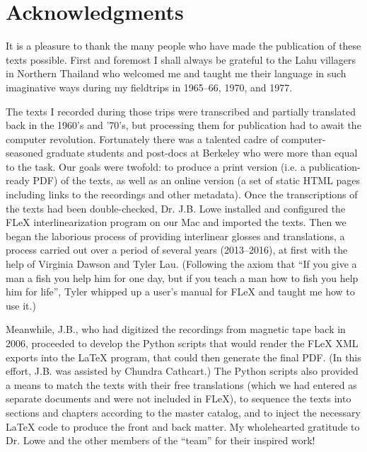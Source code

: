 \thispagestyle{empty}
\renewcommand{\thefootnote}{\arabic{footnote}}
\setcounter{footnote}{0}

\section*{Acknowledgments}
It is a pleasure to thank the many people who have made the publication
of these texts possible. First and foremost I shall always be grateful
to the Lahu villagers in Northern Thailand who welcomed me and taught me
their language in such imaginative ways during my fieldtrips in 1965--66,
1970, and 1977.

The texts I recorded during those trips were transcribed and partially
translated back in the 1960's and '70's, but processing them for
publication had to await the computer revolution. Fortunately there
was a talented cadre of computer-seasoned graduate students and
post-docs at Berkeley who were more than equal to the task. Our goals
were twofold: to produce a print version (i.e. a publication-ready PDF) of
the texts, as well as an online version (a set of static HTML pages
including links to the recordings and other metadata). Once the
transcriptions of the texts had been double-checked, Dr. J.B. Lowe
installed and configured the FLeX interlinearization program on our Mac
and imported the texts. Then we began the laborious process of providing
interlinear glosses and translations, a process
carried out over a period of several years (2013--2016), at first with
the help of Virginia Dawson and Tyler Lau.  (Following the axiom that
``If you give a man a fish you help him for one day, but if you teach
a man how to fish you help him for life'', Tyler whipped up a user's
manual for FLeX and taught me how to use it.)

Meanwhile, J.B., who had digitized the recordings from magnetic tape back in 2006,
proceeded to develop the Python scripts that would render the FLeX XML
exports into the LaTeX program, that could then generate the
final PDF. (In this effort, J.B. was assisted by Chundra
Cathcart.) The Python scripts also provided a means to match the texts
with their free translations (which we had entered as separate documents and were not included
in FLeX), to sequence the texts into sections and chapters according to
the master catalog, and to inject the necessary LaTeX code to produce
the front and back matter. My wholehearted gratitude to Dr. Lowe and the
other members of the ``team'' for their inspired work!

